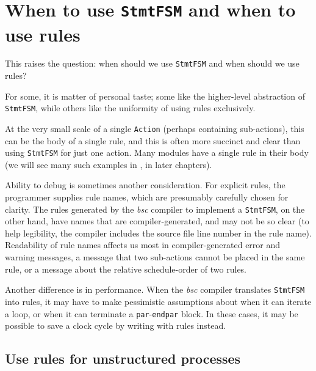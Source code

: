 
\section{When to use {\tt StmtFSM} and when to use rules}

\label{Sec_StmtFSM_vs_rules}



This raises the question: when should we
use \verb|StmtFSM| and when should we use rules?

For some, it is matter of personal taste; some like the higher-level
abstraction of \verb|StmtFSM|, while others like the uniformity of
using rules exclusively.

At the very small scale of a single \verb|Action| (perhaps containing
sub-actions), this can be the body of a single rule, and this is often
more succinct and clear than using \verb|StmtFSM| for just one action.
Many modules have a single rule in their body (we will see many such
examples in {\FIFE}, in later chapters).

Ability to debug is sometimes another consideration. For explicit
rules, the programmer supplies rule names, which are presumably
carefully chosen for clarity.  The rules generated by the \emph{bsc}
compiler to implement a \verb|StmtFSM|, on the other hand, have names
that are compiler-generated, and may not be so clear (to help
legibility, the compiler includes the source file line number in the
rule name).  Readability of rule names affects us most in
compiler-generated error and warning messages, {\eg} a message that
two sub-actions cannot be placed in the same rule, or a message about
the relative schedule-order of two rules.

Another difference is in performance.  When the \emph{bsc} compiler
translates \verb|StmtFSM| into rules, it may have to make pessimistic
assumptions about when it can iterate a loop, or when it can terminate
a \verb|par|-\verb|endpar| block.  In these cases, it may be possible
to save a clock cycle by writing with rules instead.


\subsection{Use rules for unstructured processes}

